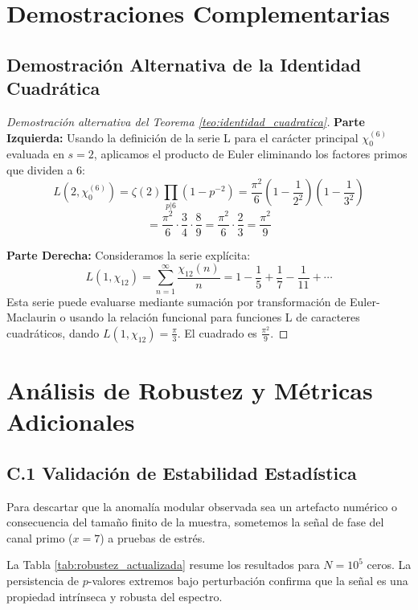 \documentclass[12pt, a4paper]{article}
\theoremstyle{plain}
\theoremstyle{definition}
\begin{document}
\section{Demostraciones Complementarias}

\subsection{Demostración Alternativa de la Identidad Cuadrática}

\begin{proof}[Demostración alternativa del Teorema \ref{teo:identidad_cuadratica}]
\textbf{Parte Izquierda:} Usando la definición de la serie L para el carácter principal $\chi_0^{(6)}$ evaluada en $s=2$, aplicamos el producto de Euler eliminando los factores primos que dividen a 6:
\[
L(2, \chi_0^{(6)}) = \zeta(2) \prod_{p|6} (1-p^{-2}) = \frac{\pi^2}{6} \left(1-\frac{1}{2^2}\right)\left(1-\frac{1}{3^2}\right)
\]
\[
= \frac{\pi^2}{6} \cdot \frac{3}{4} \cdot \frac{8}{9} = \frac{\pi^2}{6} \cdot \frac{2}{3} = \frac{\pi^2}{9}
\]

\textbf{Parte Derecha:} Consideramos la serie explícita:
\[
L(1, \chi_{12}) = \sum_{n=1}^\infty \frac{\chi_{12}(n)}{n} = 1 - \frac{1}{5} + \frac{1}{7} - \frac{1}{11} + \cdots
\]
Esta serie puede evaluarse mediante sumación por transformación de Euler-Maclaurin o usando la relación funcional para funciones L de caracteres cuadráticos, dando $L(1, \chi_{12}) = \frac{\pi}{3}$. El cuadrado es $\frac{\pi^2}{9}$.
\end{proof}

\section{Análisis de Robustez y Métricas Adicionales}

\subsection{C.1 Validación de Estabilidad Estadística}

Para descartar que la anomalía modular observada sea un artefacto numérico o consecuencia del tamaño finito de la muestra, sometemos la señal de fase del canal primo ($x=7$) a pruebas de estrés.

La Tabla \ref{tab:robustez_actualizada} resume los resultados para $N=10^5$ ceros. La persistencia de $p$-valores extremos bajo perturbación confirma que la señal es una propiedad intrínseca y robusta del espectro.
\end{document}
